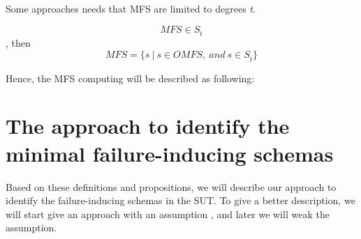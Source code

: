 \documentclass[10pt,journal,cspaper,compsoc]{IEEEtran}
\begin{document}
Some approaches needs that MFS are limited  to degrees \emph{t}.

$$ MFS \in  S_{\hat{t}}$$,
then 
$$ MFS = \{ s\ |\ s \in OMFS,\ and\ s \in S_{\hat{t}} \} $$



Hence, the MFS computing will be described as following:


%
%
%





\section{The approach to identify the minimal failure-inducing schemas}\label{sec:app}
Based on these definitions and propositions, we will describe our approach to identify the failure-inducing schemas in the SUT. To give a better description, we will start give an approach with an assumption , and later we will weak the assumption.
\end{document}
